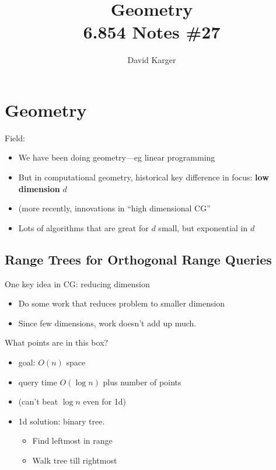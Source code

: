 \documentclass{article}
\title{Geometry\\ 6.854 Notes \#27}
\author{David Karger}
\begin{document}
\section{Geometry}

Field:
\begin{itemize}
\item We have been doing geometry---eg linear programming
\item But in computational geometry, historical key difference in focus: \textbf{low dimension} $d$
\item (more recently, innovations in ``high dimensional CG'' 
\item Lots of algorithms that are great for $d$ small, but exponential
  in $d$
\end{itemize}

\newcommand{\conv}{\mathit{conv}}


\subsection{Range Trees for Orthogonal Range Queries}

One key idea in CG: reducing dimension
\begin{itemize}
\item Do some work that reduces problem to smaller dimension
\item Since few dimensions, work doesn't add up much.
\end{itemize}

What points are in this box?
\begin{itemize}
\item goal: $O(n)$ space
\item query time $O(\log n)$ plus number of points
\item (can't beat $\log n$ even for 1d)
\item 1d solution: binary tree.  
\begin{itemize}
\item Find leftmost in range
\item Walk tree till rightmost
\end{itemize}
\end{itemize}
\end{document}
